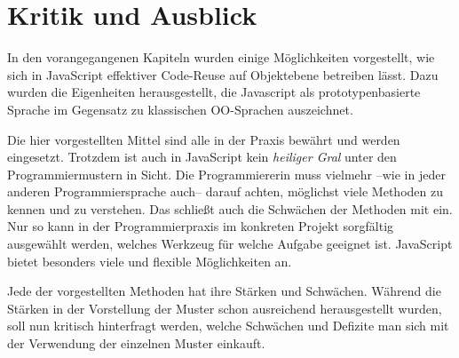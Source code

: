 
\section{Kritik und Ausblick}

In den vorangegangenen Kapiteln wurden einige Möglichkeiten vorgestellt, wie sich in JavaScript effektiver Code-Reuse auf Objektebene betreiben lässt. Dazu wurden die Eigenheiten herausgestellt, die Javascript als prototypenbasierte Sprache im Gegensatz zu klassischen OO-Sprachen auszeichnet. 

Die hier vorgestellten Mittel sind alle in der Praxis bewährt und werden eingesetzt. Trotzdem ist auch in JavaScript kein \emph{heiliger Gral} unter den Programmiermustern in Sicht. Die Programmiererin muss vielmehr --wie in jeder anderen Programmiersprache auch-- darauf achten, möglichst viele Methoden zu kennen und zu verstehen. Das schließt auch die Schwächen der Methoden mit ein. Nur so kann in der Programmierpraxis im konkreten Projekt sorgfältig ausgewählt werden, welches Werkzeug für welche Aufgabe geeignet ist. JavaScript bietet besonders viele und flexible Möglichkeiten an. 


Jede der vorgestellten Methoden hat ihre Stärken und Schwächen. Während die Stärken in der Vorstellung der Muster schon ausreichend herausgestellt wurden, soll nun kritisch hinterfragt werden, welche Schwächen und Defizite man sich mit der Verwendung der einzelnen Muster einkauft.




